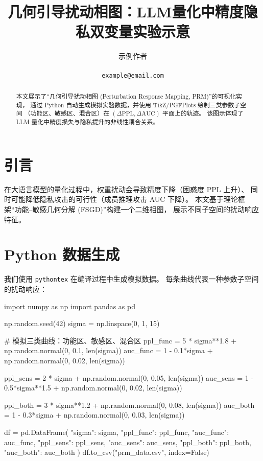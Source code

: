 \documentclass[letterpaper,twocolumn,10pt]{article}
\begin{document}
\title{几何引导扰动相图：LLM量化中精度隐私双变量实验示意}
\author{
{\rm 示例作者}\\
[机构名称] \\
{\tt example@email.com}
}
\maketitle

\begin{abstract}
本文展示了“几何引导扰动相图 (Perturbation Response Mapping, PRM)”的可视化实现，
通过 Python 自动生成模拟实验数据，并使用 TikZ/PGFPlots 绘制三类参数子空间
（功能区、敏感区、混合区）在 $(\Delta \mathrm{PPL}, \Delta \mathrm{AUC})$ 平面上的轨迹。
该图示体现了 LLM 量化中精度损失与隐私提升的非线性耦合关系。
\end{abstract}

\section{引言}
在大语言模型的量化过程中，权重扰动会导致精度下降（困惑度 $\mathrm{PPL}$ 上升）、
同时可能降低隐私攻击的可行性（成员推理攻击 AUC 下降）。
本文基于理论框架“功能–敏感几何分解 (FSGD)”构建一个二维相图，
展示不同子空间的扰动响应特征。

\section{Python 数据生成}
我们使用 \texttt{pythontex} 在编译过程中生成模拟数据。
每条曲线代表一种参数子空间的扰动响应：

\begin{pycode}
import numpy as np
import pandas as pd

np.random.seed(42)
sigma = np.linspace(0, 1, 15)

# 模拟三类曲线：功能区、敏感区、混合区
ppl_func = 5 * sigma**1.8 + np.random.normal(0, 0.1, len(sigma))
auc_func = 1 - 0.1*sigma + np.random.normal(0, 0.02, len(sigma))

ppl_sens = 2 * sigma + np.random.normal(0, 0.05, len(sigma))
auc_sens = 1 - 0.5*sigma**1.5 + np.random.normal(0, 0.02, len(sigma))

ppl_both = 3 * sigma**1.2 + np.random.normal(0, 0.08, len(sigma))
auc_both = 1 - 0.3*sigma + np.random.normal(0, 0.03, len(sigma))

df = pd.DataFrame({
    "sigma": sigma,
    "ppl_func": ppl_func,
    "auc_func": auc_func,
    "ppl_sens": ppl_sens,
    "auc_sens": auc_sens,
    "ppl_both": ppl_both,
    "auc_both": auc_both
})
df.to_csv("prm_data.csv", index=False)
\end{pycode}
\end{document}
